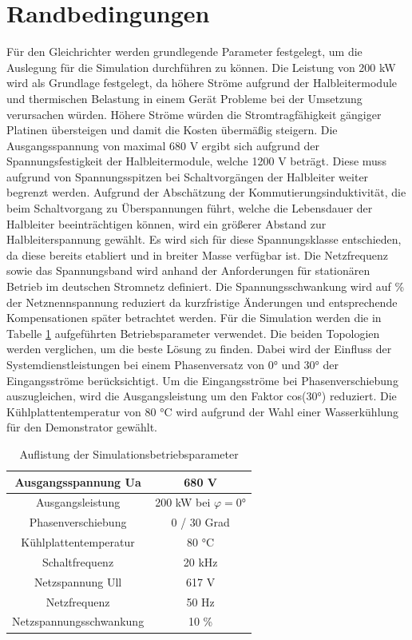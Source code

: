 \section{Randbedingungen}
Für den Gleichrichter werden grundlegende Parameter festgelegt, um die Auslegung für die Simulation durchführen zu können. Die Leistung von 200 kW wird als Grundlage festgelegt, da höhere Ströme aufgrund der Halbleitermodule und thermischen Belastung in einem Gerät Probleme bei der Umsetzung verursachen würden. Höhere Ströme würden die Stromtragfähigkeit gängiger Platinen übersteigen und damit die Kosten übermäßig steigern. Die Ausgangsspannung von maximal 680 V ergibt sich aufgrund der Spannungsfestigkeit der Halbleitermodule, welche 1200 V beträgt. Diese muss aufgrund von Spannungsspitzen bei Schaltvorgängen der Halbleiter weiter begrenzt werden. Aufgrund der Abschätzung der Kommutierungsinduktivität, die beim Schaltvorgang zu Überspannungen führt, welche die Lebensdauer der Halbleiter beeinträchtigen können, wird ein größerer Abstand zur Halbleiterspannung gewählt. Es wird sich für diese Spannungsklasse entschieden, da diese bereits etabliert und in breiter Masse verfügbar ist. Die Netzfrequenz sowie das Spannungsband wird anhand der Anforderungen für stationären Betrieb im deutschen Stromnetz definiert. Die Spannungsschwankung wird auf  \% der Netznennspannung reduziert da kurzfristige Änderungen und entsprechende Kompensationen später betrachtet werden. Für die Simulation werden die in Tabelle \ref{tab:Betriebspara} aufgeführten Betriebsparameter verwendet. Die beiden Topologien werden verglichen, um die beste Lösung zu finden. Dabei wird der Einfluss der Systemdienstleistungen bei einem Phasenversatz von 0° und 30° der Eingangsströme berücksichtigt. Um die Eingangsströme bei Phasenverschiebung auszugleichen, wird die Ausgangsleistung um den Faktor cos(30°) reduziert. Die Kühlplattentemperatur von 80 °C wird aufgrund der Wahl einer Wasserkühlung für den Demonstrator gewählt.

\begin{table}
	\centering
	\caption{Auflistung der Simulationsbetriebsparameter}
	\begin{tabular}{c c}

		Ausgangsspannung \gls{Ua} & 680 V \\
		\hline
		Ausgangsleistung & 200 kW bei $\varphi = 0°$\\
		\hline
		Phasenverschiebung & 0 / 30 Grad \\
		\hline
		Kühlplattentemperatur & 80 °C \\
		\hline
		Schaltfrequenz & 20 kHz \\
		\hline
		Netzspannung \gls{Ull} & 617 \si{\volt} \\
		\hline
		Netzfrequenz &		50 Hz \\
		\hline
		Netzspannungsschwankung & 10 \% \\
	\end{tabular}
	\label{tab:Betriebspara}
\end{table}

